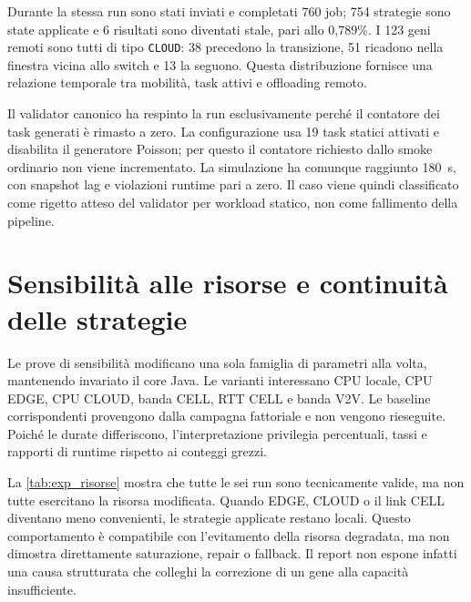 Durante la stessa run sono stati inviati e completati 760 job; 754 strategie sono state applicate e 6 risultati sono diventati stale, pari allo 0,789\%. I 123 geni remoti sono tutti di tipo \texttt{CLOUD}: 38 precedono la transizione, 51 ricadono nella finestra vicina allo switch e 13 la seguono. Questa distribuzione fornisce una relazione temporale tra mobilità, task attivi e offloading remoto.

Il validator canonico ha respinto la run esclusivamente perché il contatore dei task generati è rimasto a zero. La configurazione usa 19 task statici attivati e disabilita il generatore Poisson; per questo il contatore richiesto dallo smoke ordinario non viene incrementato. La simulazione ha comunque raggiunto 180~s, con snapshot lag e violazioni runtime pari a zero. Il caso viene quindi classificato come rigetto atteso del validator per workload statico, non come fallimento della pipeline.

\section{Sensibilità alle risorse e continuità delle strategie}
\label{sec:exp_risorse}

Le prove di sensibilità modificano una sola famiglia di parametri alla volta, mantenendo invariato il core Java. Le varianti interessano CPU locale, CPU EDGE, CPU CLOUD, banda CELL, RTT CELL e banda V2V. Le baseline corrispondenti provengono dalla campagna fattoriale e non vengono rieseguite. Poiché le durate differiscono, l'interpretazione privilegia percentuali, tassi e rapporti di runtime rispetto ai conteggi grezzi.

La \cref{tab:exp_risorse} mostra che tutte le sei run sono tecnicamente valide, ma non tutte esercitano la risorsa modificata. Quando EDGE, CLOUD o il link CELL diventano meno convenienti, le strategie applicate restano locali. Questo comportamento è compatibile con l'evitamento della risorsa degradata, ma non dimostra direttamente saturazione, repair o fallback. Il report non espone infatti una causa strutturata che colleghi la correzione di un gene alla capacità insufficiente.

